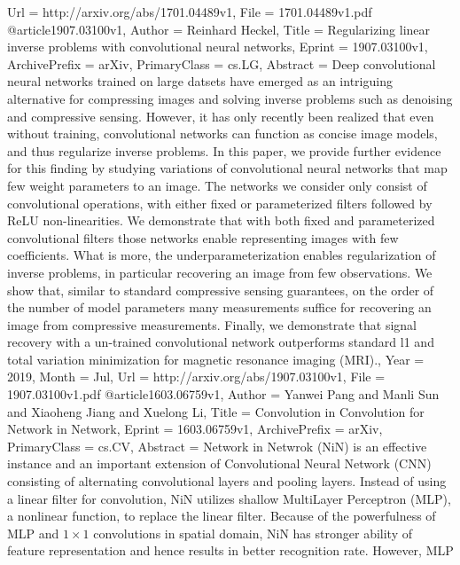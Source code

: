 {{{{Url           = {http://arxiv.org/abs/1701.04489v1},
File          = {1701.04489v1.pdf}
}
@article{1907.03100v1,
Author        = {Reinhard Heckel},
Title         = {Regularizing linear inverse problems with convolutional neural networks},
Eprint        = {1907.03100v1},
ArchivePrefix = {arXiv},
PrimaryClass  = {cs.LG},
Abstract      = {Deep convolutional neural networks trained on large datsets have emerged as
an intriguing alternative for compressing images and solving inverse problems
such as denoising and compressive sensing. However, it has only recently been
realized that even without training, convolutional networks can function as
concise image models, and thus regularize inverse problems. In this paper, we
provide further evidence for this finding by studying variations of
convolutional neural networks that map few weight parameters to an image. The
networks we consider only consist of convolutional operations, with either
fixed or parameterized filters followed by ReLU non-linearities. We demonstrate
that with both fixed and parameterized convolutional filters those networks
enable representing images with few coefficients. What is more, the
underparameterization enables regularization of inverse problems, in particular
recovering an image from few observations. We show that, similar to standard
compressive sensing guarantees, on the order of the number of model parameters
many measurements suffice for recovering an image from compressive
measurements. Finally, we demonstrate that signal recovery with a un-trained
convolutional network outperforms standard l1 and total variation minimization
for magnetic resonance imaging (MRI).},
Year          = {2019},
Month         = {Jul},
Url           = {http://arxiv.org/abs/1907.03100v1},
File          = {1907.03100v1.pdf}
}
@article{1603.06759v1,
Author        = {Yanwei Pang and Manli Sun and Xiaoheng Jiang and Xuelong Li},
Title         = {Convolution in Convolution for Network in Network},
Eprint        = {1603.06759v1},
ArchivePrefix = {arXiv},
PrimaryClass  = {cs.CV},
Abstract      = {Network in Netwrok (NiN) is an effective instance and an important extension
of Convolutional Neural Network (CNN) consisting of alternating convolutional
layers and pooling layers. Instead of using a linear filter for convolution,
NiN utilizes shallow MultiLayer Perceptron (MLP), a nonlinear function, to
replace the linear filter. Because of the powerfulness of MLP and $ 1\times 1 $
convolutions in spatial domain, NiN has stronger ability of feature
representation and hence results in better recognition rate. However, MLP
}}}}}

